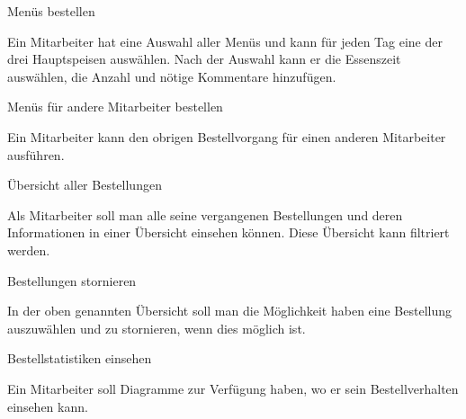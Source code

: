\begin{compactitem}
    \item Menüs bestellen
    \begin{compactitem}
        \item Ein Mitarbeiter hat eine Auswahl aller Menüs und kann für jeden Tag eine der drei Hauptspeisen auswählen. Nach der Auswahl kann er die Essenszeit auswählen, die Anzahl und nötige Kommentare hinzufügen.
    \end{compactitem}
    \item Menüs für andere Mitarbeiter bestellen
    \begin{compactitem}
        \item Ein Mitarbeiter kann den obrigen Bestellvorgang für einen anderen Mitarbeiter ausführen. 
    \end{compactitem}
    \item Übersicht aller Bestellungen
    \begin{compactitem}
        \item Als Mitarbeiter soll man alle seine vergangenen Bestellungen und deren Informationen in einer Übersicht einsehen können. Diese Übersicht kann filtriert werden.
    \end{compactitem}
    \item Bestellungen stornieren
    \begin{compactitem}
        \item In der oben genannten Übersicht soll man die Möglichkeit haben eine Bestellung auszuwählen und zu stornieren, wenn dies möglich ist.
    \end{compactitem}
    \item Bestellstatistiken einsehen
    \begin{compactitem}
        \item Ein Mitarbeiter soll Diagramme zur Verfügung haben, wo er sein Bestellverhalten einsehen kann.
    \end{compactitem}
\end{compactitem}
